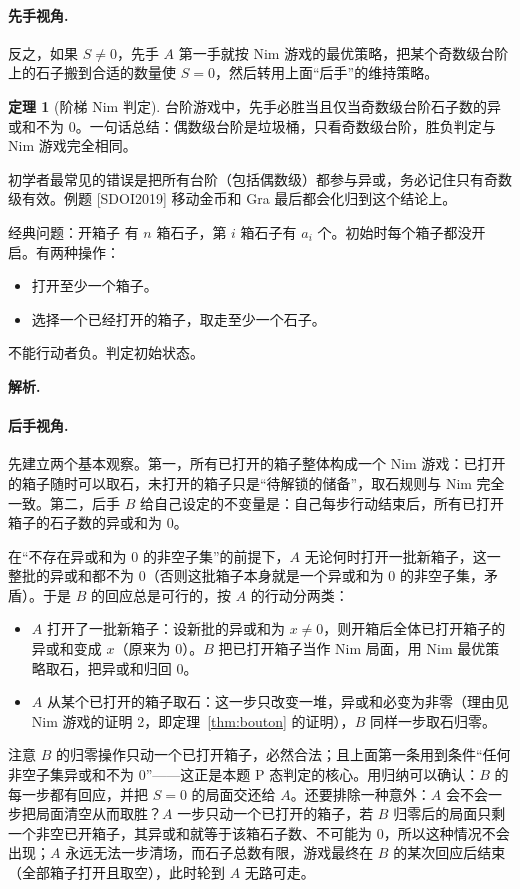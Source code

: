 \documentclass[UTF8,a4paper,11pt,oneside,openany,fontset=fandol]{ctexbook}
\theoremstyle{definition}
\newtheorem{theorem}[definition]{定理}
\newcommand{\sol}{\par\noindent\textbf{解析.}\ }
\begin{document}
\paragraph{先手视角.} 反之，如果 $S\ne0$，先手 $A$ 第一手就按 Nim 游戏的最优策略，把某个奇数级台阶上的石子搬到合适的数量使 $S=0$，然后转用上面“后手”的维持策略。

\begin{theorem}[阶梯 Nim 判定]\label{thm:stairnim}
台阶游戏中，先手必胜当且仅当奇数级台阶石子数的异或和不为 $0$。一句话总结：偶数级台阶是垃圾桶，只看奇数级台阶，胜负判定与 Nim 游戏完全相同。
\end{theorem}

\begin{pitfall}[只有奇数级参与异或]
初学者最常见的错误是把所有台阶（包括偶数级）都参与异或，务必记住只有奇数级有效。例题 [SDOI2019] 移动金币和 Gra 最后都会化归到这个结论上。
\end{pitfall}

\begin{problem}{经典问题：开箱子}
有 $n$ 箱石子，第 $i$ 箱石子有 $a_i$ 个。初始时每个箱子都没开启。有两种操作：
\begin{itemize}
\item 打开至少一个箱子。
\item 选择一个已经打开的箱子，取走至少一个石子。
\end{itemize}
不能行动者负。判定初始状态。
\end{problem}

\sol \paragraph{后手视角.} 先建立两个基本观察。第一，所有已打开的箱子整体构成一个 Nim 游戏：已打开的箱子随时可以取石，未打开的箱子只是“待解锁的储备”，取石规则与 Nim 完全一致。第二，后手 $B$ 给自己设定的不变量是：自己每步行动结束后，所有已打开箱子的石子数的异或和为 $0$。

在“不存在异或和为 $0$ 的非空子集”的前提下，$A$ 无论何时打开一批新箱子，这一整批的异或和都不为 $0$（否则这批箱子本身就是一个异或和为 $0$ 的非空子集，矛盾）。于是 $B$ 的回应总是可行的，按 $A$ 的行动分两类：
\begin{itemize}
\item $A$ 打开了一批新箱子：设新批的异或和为 $x\ne0$，则开箱后全体已打开箱子的异或和变成 $x$（原来为 $0$）。$B$ 把已打开箱子当作 Nim 局面，用 Nim 最优策略取石，把异或和归回 $0$。
\item $A$ 从某个已打开的箱子取石：这一步只改变一堆，异或和必变为非零（理由见 Nim 游戏的证明 2，即定理~\ref{thm:bouton} 的证明），$B$ 同样一步取石归零。
\end{itemize}
注意 $B$ 的归零操作只动一个已打开箱子，必然合法；且上面第一条用到条件“任何非空子集异或和不为 $0$”——这正是本题 P 态判定的核心。用归纳可以确认：$B$ 的每一步都有回应，并把 $S=0$ 的局面交还给 $A$。还要排除一种意外：$A$ 会不会一步把局面清空从而取胜？$A$ 一步只动一个已打开的箱子，若 $B$ 归零后的局面只剩一个非空已开箱子，其异或和就等于该箱石子数、不可能为 $0$，所以这种情况不会出现；$A$ 永远无法一步清场，而石子总数有限，游戏最终在 $B$ 的某次回应后结束（全部箱子打开且取空），此时轮到 $A$ 无路可走。
\end{document}
